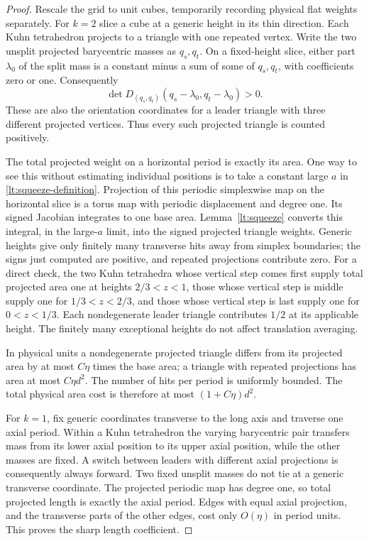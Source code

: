 \begin{proof}
Rescale the grid to unit cubes, temporarily recording physical
flat weights separately.  For $k=2$ slice a cube at a generic
height in its thin direction.  Each Kuhn tetrahedron projects to
a triangle with one repeated vertex.  Write the two unsplit
projected barycentric masses as $q_s,q_t$.  On a fixed-height
slice, either part $\lambda_0$ of the split mass is a constant
minus a sum of some of $q_s,q_t$, with coefficients zero or one.
Consequently
\[
 \det D_{(q_s,q_t)}(q_s-\lambda_0,q_t-\lambda_0)>0.
\]
These are also the orientation coordinates for a leader triangle
with three different projected vertices.  Thus every such
projected triangle is counted positively.

The total projected weight on a horizontal period is exactly
its area.  One way to see this without estimating individual
positions is to take a constant large $a$ in
\eqref{lt:squeeze-definition}.  Projection of this periodic
simplexwise map on the horizontal slice is a torus map with
periodic displacement and degree one.  Its signed Jacobian
integrates to one base area.  Lemma~\ref{lt:squeeze} converts
this integral, in the large-$a$ limit, into the signed projected
triangle weights.  Generic heights give only finitely many
transverse hits away from simplex boundaries; the signs just
computed are positive, and repeated projections contribute zero.
For a direct check, the two Kuhn tetrahedra whose vertical step
comes first supply total projected area one at heights
$2/3<z<1$, those whose vertical step is middle supply one for
$1/3<z<2/3$, and those whose vertical step is last supply one for
$0<z<1/3$.  Each nondegenerate leader triangle contributes $1/2$
at its applicable height.  The finitely many exceptional heights
do not affect translation averaging.

In physical units a nondegenerate projected triangle differs
from its projected area by at most $C\eta$ times the base area;
a triangle with repeated projections has area at most
$C\eta d^2$.  The number of hits per period is uniformly bounded.
The total physical area cost is therefore at most
$(1+C\eta)d^2$.

For $k=1$, fix generic coordinates transverse to the long axis
and traverse one axial period.  Within a Kuhn tetrahedron the
varying barycentric pair transfers mass from its lower axial
position to its upper axial position, while the other masses
are fixed.  A switch between leaders with different axial
projections is consequently always forward.  Two fixed
unsplit masses do not tie at a generic transverse coordinate.
The projected periodic map has degree one, so total projected
length is exactly the axial period.  Edges with equal axial
projection, and the transverse parts of the other edges, cost
only $O(\eta)$ in period units.  This proves the sharp length
coefficient.


\end{proof}
